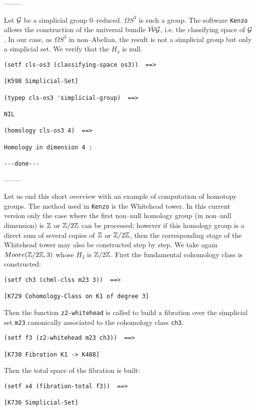 \begin{center}
--------
\end{center}
Let ${\cal G}$ be a simplicial group $0$--reduced. $\Omega S^3$ is such a group.
The software  {\tt Kenzo} allows 
the construction of the universal bundle $\bar{\cal W}{\cal G}$, i.e. the 
classifying space of ${\cal G}$. In our case, as $\Omega S^3$ in non--Abelian, the
result is not a simplicial group but only a simplicial set. We verify that the $H_4$ is null.
{\footnotesize\begin{verbatim}
(setf cls-os3 (classifying-space os3))  ==>

[K598 Simplicial-Set]

(typep cls-os3 'simplicial-group)  ==>

NIL

(homology cls-os3 4)  ==>

Homology in dimension 4 :

---done---
\end{verbatim}}
\begin{center}
--------
\end{center}
\vskip 0.40cm
Let us end this short overview with an example of computation of homotopy groups.
The method used in {\tt Kenzo} is the Whitehead tower. 
In this current version only the case where the first non--null
homology group (in non--null dimension) is ${{\Bbb Z}}$ or ${{\Bbb Z}}/{2 {{\Bbb Z}}}$ can be processed; however if this 
homology group is a direct sum of several copies of ${{\Bbb Z}}$ or ${{\Bbb Z}}/{2 {{\Bbb Z}}}$, then the corresponding
stage of the Whitehead tower may also be constructed step by step.
\vskip 0.40cm
We take again $Moore({{\Bbb Z}}/2{{\Bbb Z}}, 3)$ whose $H_3$ is ${{\Bbb Z}}/2{{\Bbb Z}}$. First the fundamental cohomology
class is constructed:
{\footnotesize\begin{verbatim}
(setf ch3 (chml-clss m23 3))  ==>

[K729 Cohomology-Class on K1 of degree 3]
\end{verbatim}}
Then the function {\tt z2-whitehead} is called to build a fibration over the simplicial set {\tt m23}
canonically associated to the cohomology class {\tt ch3}.
{\footnotesize\begin{verbatim}
(setf f3 (z2-whitehead m23 ch3))  ==>

[K730 Fibration K1 -> K488]
\end{verbatim}}
Then the total space of the fibration is built:
{\footnotesize\begin{verbatim}
(setf x4 (fibration-total f3))  ==>

[K736 Simplicial-Set]
\end{verbatim}}
